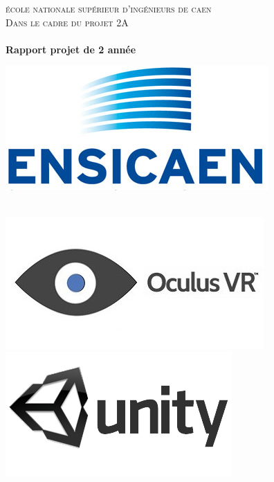 \documentclass[a4paper,11pt]{myreport}
\begin{document}
  \begin{titlepage}
  \centering
      {\large \textsc{école nationale supérieur d'ingénieurs de caen}}\\
      \textsc{Dans le cadre du projet 2A}\\
    \vspace{1cm}
    \vspace{1cm}
      {\large\textbf{	\@date\\
      \LARGE{Rapport projet de 2 année}}}
      
    \vfill
      \includegraphics[width=0.25\textheight,center]{./images/LogoEnsicaenSansTexte.jpg}
    \vfill
       {\LARGE \textbf{\@title}} \\
    \vspace{1em}
        {\large \@author} \\
    \vfill

        \includegraphics[width=0.25\textheight,left]{./images/oculus_logo.jpg}
        \includegraphics[width=0.25\textheight,right]{./images/Unity_3D_logo.png}

  \end{titlepage}
\makeatother
\end{document}
